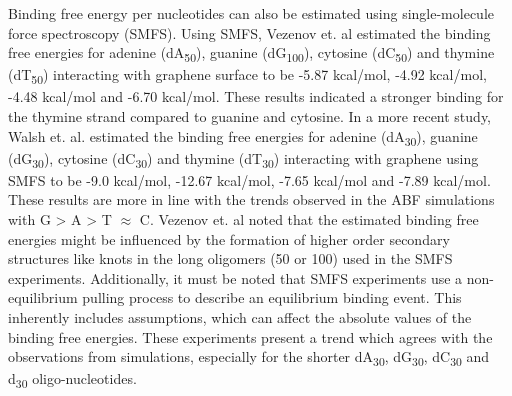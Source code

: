 Binding free energy per nucleotides can also be estimated using single-molecule force spectroscopy (SMFS). Using SMFS, Vezenov et. al estimated the binding free energies for adenine (dA\textsubscript{50}), guanine (dG\textsubscript{100}), cytosine (dC\textsubscript{50}) and thymine (dT\textsubscript{50}) interacting with graphene surface to be -5.87 kcal/mol, -4.92 kcal/mol, -4.48 kcal/mol and -6.70 kcal/mol.\supercite{manohar_peeling_2008,iliafar_quantifying_2012} These results indicated a stronger binding for the thymine strand compared to guanine and cytosine. In a more recent study, Walsh et. al. estimated the binding free energies for adenine (dA\textsubscript{30}), guanine (dG\textsubscript{30}), cytosine (dC\textsubscript{30}) and thymine (dT\textsubscript{30}) interacting with graphene using SMFS to be -9.0 kcal/mol, -12.67 kcal/mol, -7.65 kcal/mol and -7.89 kcal/mol.\supercite{hughes_adsorption_2017} These results are more in line with the trends observed in the ABF simulations with G > A > T $\approx$ C. Vezenov et. al noted that the estimated binding free energies might be influenced by the formation of higher order secondary structures like knots in the long oligomers (50 or 100) used in the SMFS experiments.\supercite{manohar_peeling_2008,iliafar_quantifying_2012} Additionally, it must be noted that SMFS experiments use a non-equilibrium pulling process to describe an equilibrium binding event. This inherently includes assumptions, which can affect the absolute values of the binding free energies. These experiments present a trend which agrees with the observations from simulations, especially for the shorter dA\textsubscript{30}, dG\textsubscript{30}, dC\textsubscript{30} and d\textsubscript{30} oligo-nucleotides. 

